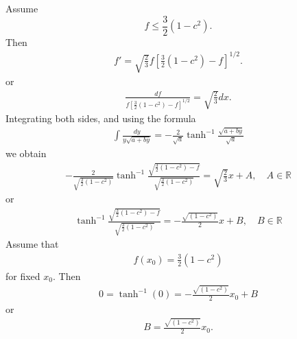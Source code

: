 \documentclass[12pt,reqno]{amsart}
\numberwithin{equation}{section}  %
\newcommand{\rr}{\mathbb{R}}
\begin{document}
%
%
Assume $$f \le \frac{3}{2}(1-c^{2}).$$ 
%
%
Then
%
%
\begin{equation*}
\begin{split}
  f' = \sqrt{\frac{2}{3}}f \left[ \frac{3}{2}(1 - c^{2}) -f \right]^{1/2}.
\end{split}
\end{equation*}
%
%
or
%
%
\begin{equation*}
\begin{split}
\frac{df}{ f \left[ \frac{3}{2}(1 - c^{2}) -f \right]^{1/2}} = \sqrt{\frac{2}{3}}
dx.
\end{split}
\end{equation*}
%
%
Integrating both sides, and using the formula
%
%
\begin{equation}
  \label{key-int-form}
\begin{split}
  \int \frac{dy}{y \sqrt{a + by}} = -\frac{2}{ \sqrt{a}} \tanh^{-1}
  \frac{\sqrt{a+ by}}{ \sqrt{a}}
\end{split}
\end{equation}
%
%
we obtain
%
%
\begin{equation*}
\begin{split}
  -\frac{2}{\sqrt{\frac{3}{2}(1-c^{2})}} \tanh^{-1}
  \frac{\sqrt{\frac{3}{2}(1-c^{2}) - f}}{\sqrt{\frac{3}{2}(1-c^{2})}} =
  \sqrt{\frac{2}{3}}x + A, \quad A \in \rr
\end{split}
\end{equation*}
%
%
or
\begin{equation*}
\begin{split}
  \tanh^{-1}
  \frac{\sqrt{\frac{3}{2}(1-c^{2}) - f}}{\sqrt{\frac{3}{2}(1-c^{2})}} =
  - \frac{\sqrt{(1-c^{2})}}{2}x + B, \quad B \in \rr
\end{split}
\end{equation*}
%
Assume that
%
%
\begin{equation*}
\begin{split}
  f(x_{0}) = \frac{3}{2}(1-c^{2})
\end{split}
\end{equation*}
%
%
for fixed $x_{0}$. Then
%
%
\begin{equation*}
\begin{split}
  0 = \tanh^{-1}(0) = - \frac{\sqrt{(1-c^{2})}}{2}x_{0} + B
\end{split}
\end{equation*}
%
%
or
%
%
\begin{equation*}
\begin{split}
B = \frac{\sqrt{(1-c^{2})}}{2}x_{0}.
\end{split}
\end{equation*}
\end{document}
